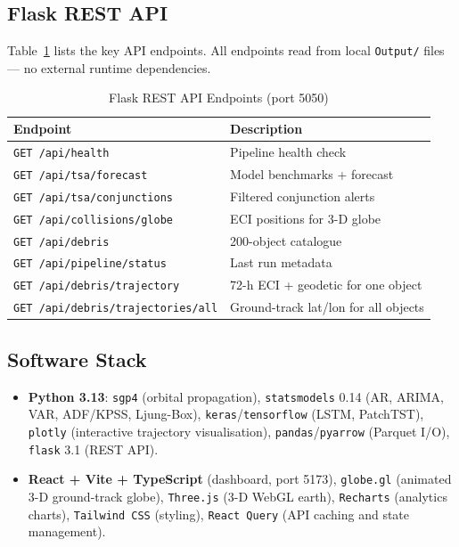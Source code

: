 \documentclass[conference]{IEEEtran}
\begin{document}
\subsection{Flask REST API}

Table~\ref{tab:api} lists the key API endpoints. All endpoints read from
local \texttt{Output/} files — no external runtime dependencies.

\begin{table}[H]
\centering
\caption{Flask REST API Endpoints (port 5050)}
\label{tab:api}
\begin{tabular}{ll}
\toprule
\textbf{Endpoint} & \textbf{Description} \\
\midrule
\texttt{GET /api/health}                & Pipeline health check \\
\texttt{GET /api/tsa/forecast}          & Model benchmarks + forecast \\
\texttt{GET /api/tsa/conjunctions}      & Filtered conjunction alerts \\
\texttt{GET /api/collisions/globe}      & ECI positions for 3-D globe \\
\texttt{GET /api/debris}                & 200-object catalogue \\
\texttt{GET /api/pipeline/status}       & Last run metadata \\
\texttt{GET /api/debris/trajectory}     & 72-h ECI + geodetic for one object \\
\texttt{GET /api/debris/trajectories/all} & Ground-track lat/lon for all objects \\
\bottomrule
\end{tabular}
\end{table}

\subsection{Software Stack}

\begin{itemize}
  \item \textbf{Python 3.13}: \texttt{sgp4} (orbital propagation),
        \texttt{statsmodels} 0.14 (AR, ARIMA, VAR, ADF/KPSS, Ljung-Box),
        \texttt{keras}/\texttt{tensorflow} (LSTM, PatchTST),
        \texttt{plotly} (interactive trajectory visualisation),
        \texttt{pandas}/\texttt{pyarrow} (Parquet I/O),
        \texttt{flask} 3.1 (REST API).
  \item \textbf{React + Vite + TypeScript} (dashboard, port 5173),
        \texttt{globe.gl} (animated 3-D ground-track globe),
        \texttt{Three.js} (3-D WebGL earth),
        \texttt{Recharts} (analytics charts),
        \texttt{Tailwind CSS} (styling),
        \texttt{React Query} (API caching and state management).
\end{itemize}
\end{document}
